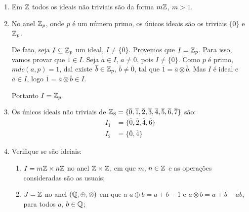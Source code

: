 \begin{exemplo}
    \begin{enumerate}[label={\arabic*})]
		\item Em $\mathbb{Z}$ todos os ideais n{\~a}o triviais s{\~a}o da forma $m\mathbb{Z}$, $m > 1$.
		\item No anel $\mathbb{Z}_p$, onde $p$ {\'e} um n{\'u}mero primo, os {\'u}nicos ideais  s{\~a}o os triviais $\{\overline{0}\}$ e $\mathbb{Z}_p$.
        \begin{solucao}
            De fato, seja $I \subseteq \mathbb{Z}_p$ um ideal, $I \neq \{\overline{0}\}$. Provemos que $I = \mathbb{Z}_p$. Para isso, vamos
            provar que $\overline{1} \in I$. Seja $\overline{a} \in I$, $\overline{a} \neq \overline{0}$, pois $I \neq
            \{\overline{0}\}$. Como $p$ {\'e} primo, $mdc(a,p) = 1$, da{\'\i} existe $\overline{b} \in \mathbb{Z}_p$,
            $\overline{b} \neq \overline{0}$, tal que $\overline{1} = \overline{a} \otimes \overline{b}$. Mas $I$ {\'e}
            ideal e $\overline{a} \in I$, logo $\overline{1} = \overline{a} \otimes \overline{b} \in I$.

            Portanto $I = \mathbb{Z}_p$.
        \end{solucao}

		\item Os {\'u}nicos ideais n{\~a}o triviais de $\mathbb{Z}_8 = \{\overline{0}, \overline{1}, \overline{2}, \overline{3}, \overline{4}, \overline{5}, \overline{6}, \overline{7}\}$ s{\~a}o:
		\begin{align*}
			I_1 &= \{\overline{0}, \overline{2}, \overline{4}, \overline{6}\}\\
			I_2 &=\{\overline{0}, \overline{4}\}
		\end{align*}

        \item Verifique se s\~ao ideiais:
            \begin{enumerate}[label=({\alph*})]
                \item $I = m\mathbb{Z} \times n\mathbb{Z}$ no anel $\mathbb{Z} \times \mathbb{Z}$, em que $m$, $n \in \mathbb{Z}$ e as operações consideradas são as usuais;

                \item $J = \mathbb{Z}$ no anel $(\mathbb{Q}, \oplus, \otimes)$ em que a $a \oplus b = a + b - 1$ e $a \otimes b = a + b - ab$, para todos $a$, $b \in \mathbb{Q}$;


\end{enumerate}
\end{enumerate}
\end{exemplo}
